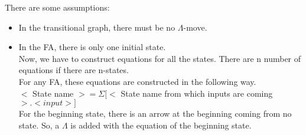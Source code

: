 \documentclass[9pt]{beamer}
\begin{document}
\begin{frame}
There are some assumptions:\\

\vspace*{0.1cm}
\begin{itemize}
  \item In the transitional graph, there must be no $\Lambda$-move.\\
  \item In the FA, there is only one initial state.\\
  
  \vspace*{0.1cm}
\hspace*{0.5cm} Now, we have to construct equations for all the states. There are n number of equations if there are
n-states.\\
\hspace*{0.5cm} For any FA, these equations are constructed in the following way.\\

\vspace*{0.1cm}
\hspace*{1cm} $<$ State name $> = \Sigma [<$ State name from which inputs are coming $>. < input >]$ \\

\vspace*{0.1cm}
For the beginning state, there is an arrow at the beginning coming from no state. So, a $\Lambda$ is added with
the equation of the beginning state.\\
\end{itemize}
\end{frame}
\end{document}
